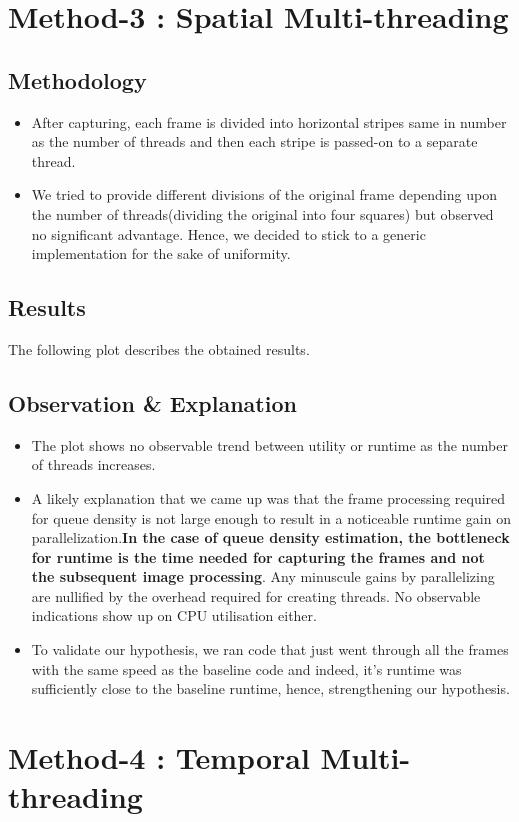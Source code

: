 \documentclass[a4paper]{article}
\begin{document}
\section*{Method-3 : Spatial Multi-threading}
\subsection*{Methodology}
\begin{itemize}
    \item After capturing, each frame is divided into horizontal stripes same in number as the number of threads and then each stripe is passed-on to a separate thread. 
    \item We tried to provide different divisions of the original frame depending upon the number of threads(dividing the original into four squares) but observed no significant advantage. Hence, we decided to stick to a generic implementation for the sake of uniformity.
\end{itemize}
\subsection*{Results}
The following plot describes the obtained results.
\subsection*{Observation \& Explanation}
\begin{itemize}
    \item The plot shows no observable trend between utility or runtime as the number of threads increases. \item A likely explanation that we came up was that the frame processing required for queue density is not large enough to result in a noticeable runtime gain on parallelization.\textbf{In the case of queue density estimation, the bottleneck for runtime is the time needed for capturing the frames and not the subsequent image processing}. Any minuscule gains by parallelizing are nullified by the overhead required for creating threads. No observable indications show up on CPU utilisation either.
    \item To validate our hypothesis, we ran code that just went through all the frames with the same speed as the baseline code and indeed, it's runtime was sufficiently close to the baseline runtime, hence, strengthening our hypothesis.
\end{itemize}
\section*{Method-4 : Temporal Multi-threading}
\end{document}
